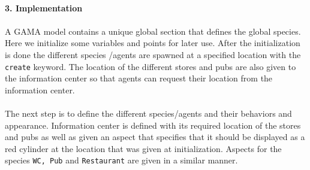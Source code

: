 \documentclass[a4paper,10pt]{article}
\begin{document}
\maketitle
\textbf
{\\3. Implementation\\\\}
A GAMA model contains a unique global section that defines the global species. Here we initialize some variables and points for later use. After the initialization is done the different species /agents are spawned at a specified location with the \texttt{create} keyword. The location of the different stores and pubs are also given to the information center so that agents can request their location from the information center. \\\\The next step is to define the different species/agents and their behaviors and appearance. Information center is defined with its required location of the stores and pubs as well as given an aspect that specifies that it should be displayed as a red cylinder at the location that was given at initialization. Aspects for the species \texttt{WC, Pub} and \texttt{Restaurant} are given in a similar manner.
\end{document}
